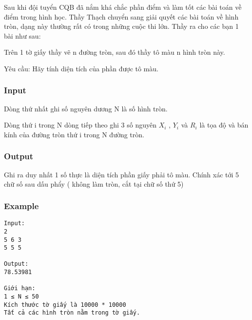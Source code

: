 



   Sau khi đội tuyển CQB đã nắm khá chắc phần điểm và làm tốt các bài toán về điểm trong hình học. Thầy Thạch chuyển sang giải quyết các bài toán về hình tròn, dạng này thường rất có trong những cuộc thi lớn. Thầy ra cho các bạn 1 bài như sau:  

   Trên 1 tờ giấy thầy vẽ n đường tròn, sau đó thầy tô màu n hình tròn này.  

   Yêu cầu: Hãy tính diện tích của phần được tô màu.  

\subsubsection{   Input  }

   Dòng thứ nhất ghi số nguyên dương N là số hình tròn.  

   Dòng thứ i trong N dòng tiếp theo ghi 3 số nguyên $X_{i}$   , $Y_{i}$   và $R_{i}$   là tọa độ và bán kính của đường tròn thứ i trong N đường tròn.  

\subsubsection{   Output  }

   Ghi ra duy nhất 1 số thực là diện tích phần giấy phải tô màu. Chính xác tới 5 chữ số sau dấu phẩy ( không làm tròn, cắt tại chữ số thứ 5)  

\subsubsection{   Example  }
\begin{verbatim}
Input:
2
5 6 3
5 5 5

Output:
78.53981

Giới hạn:
1 ≤ N ≤ 50
Kích thước tờ giấy là 10000 * 10000
Tất cả các hình tròn nằm trong tờ giấy.
\end{verbatim}
